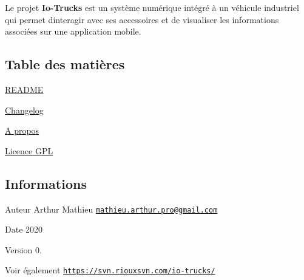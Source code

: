 Le projet {\bfseries Io-\/\+Trucks} est un système numérique intégré à un véhicule industriel qui permet d\textquotesingle{}interagir avec ses accessoires et de visualiser les informations associées sur une application mobile.\hypertarget{index_section_tdm}{}\subsection{Table des matières}\label{index_section_tdm}

\begin{DoxyItemize}
\item \hyperlink{page__r_e_a_d_m_e}{R\+E\+A\+D\+ME}
\item \hyperlink{page_changelog}{Changelog}
\item \hyperlink{page_about}{A propos}
\item \hyperlink{page_licence}{Licence G\+PL}
\end{DoxyItemize}\hypertarget{index_section_infos}{}\subsection{Informations}\label{index_section_infos}
\begin{DoxyAuthor}{Auteur}
Arthur Mathieu \href{mailto:mathieu.arthur.pro@gmail.com}{\tt mathieu.\+arthur.\+pro@gmail.\+com} 
\end{DoxyAuthor}
\begin{DoxyDate}{Date}
2020 
\end{DoxyDate}
\begin{DoxyVersion}{Version}
0. 
\end{DoxyVersion}
\begin{DoxySeeAlso}{Voir également}
\href{https://svn.riouxsvn.com/io-trucks/}{\tt https\+://svn.\+riouxsvn.\+com/io-\/trucks/} 
\end{DoxySeeAlso}
